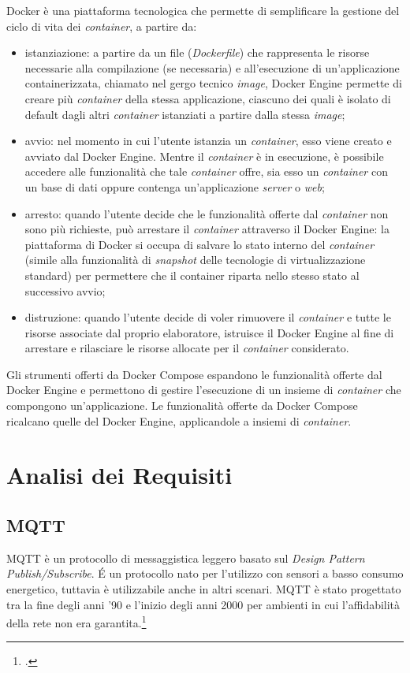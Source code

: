 Docker è una piattaforma tecnologica che permette di semplificare la gestione del ciclo di vita dei \emph{container}, a partire da:
\begin{itemize}
	\item istanziazione: a partire da un file (\emph{Dockerfile}) che rappresenta le risorse necessarie alla compilazione (se necessaria) e all'esecuzione di un'applicazione containerizzata, chiamato nel gergo tecnico \emph{image}, Docker Engine permette di creare più \emph{container} della stessa applicazione, ciascuno dei quali è isolato di default dagli altri \emph{container} istanziati a partire dalla stessa \emph{image};
	\item avvio: nel momento in cui l'utente istanzia un \emph{container}, esso viene creato e avviato dal Docker Engine. Mentre il \emph{container} è in esecuzione, è possibile accedere alle funzionalità che tale \emph{container} offre, sia esso un \emph{container} con un base di dati oppure contenga un'applicazione \emph{server} o \emph{web};
	\item arresto: quando l'utente decide che le funzionalità offerte dal \emph{container} non sono più richieste, può arrestare il \emph{container} attraverso il Docker Engine: la piattaforma di Docker si occupa di salvare lo stato interno del \emph{container} (simile alla funzionalità di \emph{snapshot} delle tecnologie di virtualizzazione standard) per permettere che il container riparta nello stesso stato al successivo avvio;
	\item distruzione: quando l'utente decide di voler rimuovere il \emph{container} e tutte le risorse associate dal proprio elaboratore, istruisce il Docker Engine al fine di arrestare e rilasciare le risorse allocate per il \emph{container} considerato.
\end{itemize}
Gli strumenti offerti da Docker Compose espandono le funzionalità offerte dal Docker Engine e permettono di gestire l'esecuzione di un insieme di \emph{container} che compongono un'applicazione. Le funzionalità offerte da Docker Compose ricalcano quelle del Docker Engine, applicandole a insiemi di \emph{container}.

\section{Analisi dei Requisiti}
\label{ar}

\subsection{MQTT}
\label{subsec:mqtt}
MQTT è un protocollo di messaggistica leggero basato sul \emph{Design Pattern} \emph{Publish/Subscribe}.
É un protocollo nato per l'utilizzo con sensori a basso consumo energetico, tuttavia è utilizzabile anche in altri scenari.
MQTT è stato progettato tra la fine degli anni '90 e l'inizio degli anni 2000 per ambienti in cui l'affidabilità della rete non era garantita.\footcite{mqtt}

